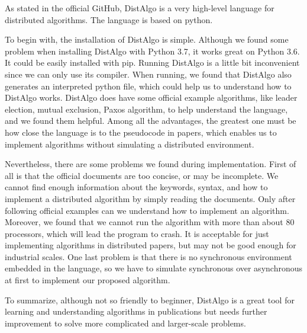 \documentclass[11pt]{article}  %
\begin{document}
As stated in the official GitHub, DistAlgo is a very high-level language for distributed algorithms. The language is based on python.\par
To begin with, the installation of DistAlgo is simple. Although we found some problem when installing DistAlgo with Python 3.7, it works great on Python 3.6. It could be easily installed with pip. Running DistAlgo is a little bit inconvenient since we can only use its compiler. When running, we found that DistAlgo also generates an interpreted python file, which could help us to understand how to DistAlgo works. DistAlgo does have some official example algorithms, like leader election, mutual exclusion, Paxos algorithm, to help understand the language, and we found them helpful. Among all the advantages, the greatest one must be how close the language is to the pseudocode in papers, which enables us to implement algorithms without simulating a distributed environment.\par
Nevertheless, there are some problems we found during implementation. First of all is that the official documents are too concise, or may be incomplete. We cannot find enough information about the keywords, syntax, and how to implement a distributed algorithm by simply reading the documents. Only after following official examples can we understand how to implement an algorithm. Moreover, we found that we cannot run the algorithm with more than about 80 processors, which will lead the program to crash. It is acceptable for just implementing algorithms in distributed papers, but may not be good enough for industrial scales. One last problem is that there is no synchronous environment embedded in the language, so we have to simulate synchronous over asynchronous at first to implement our proposed algorithm.\par
To summarize, although not so friendly to beginner, DistAlgo is a great tool for learning and understanding algorithms in publications but needs further improvement to solve more complicated and larger-scale problems.\par
\end{document}
